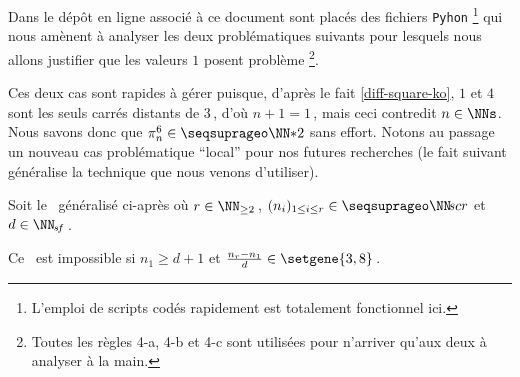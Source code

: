 Dans le dépôt en ligne associé à ce document sont placés des fichiers \verb#Pyhon#
\footnote{
	L'emploi de scripts codés rapidement est totalement fonctionnel ici.
}
qui nous amènent à analyser les deux \sftab[x] problématiques suivants pour lesquels nous allons justifier que les valeurs $1$ posent problème
\footnote{
	Toutes les règles 4-a, 4-b et 4-c sont utilisées pour n'arriver qu'aux deux \sftab[x] à analyser à la main.
}.
%
\begin{center}
\end{center}


Ces deux cas sont rapides à gérer puisque, d'après le fait \ref{diff-square-ko}, $1$ et $4$ sont les seuls carrés distants de $3$\,, d'où $n+1 = 1$\,, mais ceci contredit $n \in \NNs$. Nous savons donc que $\consprod<6> \in \NNssquare$ sans effort.
Notons au passage un nouveau cas problématique \enquote{local} pour nos futures recherches (le fait suivant généralise la technique que nous venons d'utiliser).


\newpage
\begin{fact} \label{sftable-illegal-1-sol}
	Soit le \sftab\ généralisé ci-après où
	$r \in \NN_{\geq 2}$\,,
	$( n_i )_{1 \leq i \leq r} \in \NNseq[r]$
	et
	$d \in \NNsf$\,.

    \begin{center}
    \end{center}

	Ce \sftab\ est impossible si $n_1 \geq d+1$
	et
	$\frac{n_r - n_1}{d} \in \setgene{3, 8}$\,.
\end{fact}


